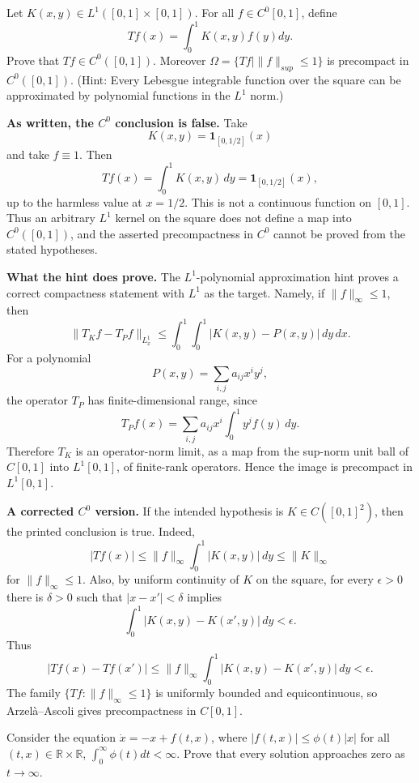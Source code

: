 \begin{exercise}
\label{analysis:2010:5}
Let $K(x, y) \in L^1([0, 1] \times [0, 1])$. For all $f \in C^0[0, 1]$, define
\[
Tf(x) = \int_0^1 K(x, y) f(y) dy.
\]
Prove that $Tf \in C^0([0, 1])$. Moreover $\Omega = \{ Tf \mid \|f\|_{sup} \leq 1 \}$ is precompact in $C^0([0, 1])$. (Hint: Every Lebesgue integrable function over the square can be approximated by polynomial functions in the $L^1$ norm.)
\end{exercise}

\begin{solution}
\textbf{As written, the $C^0$ conclusion is false.}
Take
\[
K(x,y)=\mathbf 1_{[0,1/2]}(x)
\]
and take \(f\equiv 1\). Then
\[
Tf(x)=\int_0^1K(x,y)\,dy=\mathbf 1_{[0,1/2]}(x),
\]
up to the harmless value at \(x=1/2\). This is not a continuous function on \([0,1]\). Thus an arbitrary \(L^1\) kernel on the square does not define a map into \(C^0([0,1])\), and the asserted precompactness in \(C^0\) cannot be proved from the stated hypotheses.

\textbf{What the hint does prove.}
The \(L^1\)-polynomial approximation hint proves a correct compactness statement with \(L^1\) as the target. Namely, if \(\|f\|_\infty\leq 1\), then
\[
\|T_Kf-T_Pf\|_{L^1_x}
\leq \int_0^1\int_0^1 |K(x,y)-P(x,y)|\,dy\,dx.
\]
For a polynomial
\[
P(x,y)=\sum_{i,j}a_{ij}x^iy^j,
\]
the operator \(T_P\) has finite-dimensional range, since
\[
T_Pf(x)=\sum_{i,j}a_{ij}x^i\int_0^1y^jf(y)\,dy.
\]
Therefore \(T_K\) is an operator-norm limit, as a map from the sup-norm unit ball of \(C[0,1]\) into \(L^1[0,1]\), of finite-rank operators. Hence the image is precompact in \(L^1[0,1]\).

\textbf{A corrected $C^0$ version.}
If the intended hypothesis is \(K\in C([0,1]^2)\), then the printed conclusion is true. Indeed,
\[
|Tf(x)|\leq \|f\|_\infty \int_0^1 |K(x,y)|\,dy
\leq \|K\|_\infty
\]
for \(\|f\|_\infty\leq 1\). Also, by uniform continuity of \(K\) on the square, for every \(\epsilon>0\) there is \(\delta>0\) such that \(|x-x'|<\delta\) implies
\[
\int_0^1 |K(x,y)-K(x',y)|\,dy<\epsilon.
\]
Thus
\[
|Tf(x)-Tf(x')|
\leq \|f\|_\infty\int_0^1|K(x,y)-K(x',y)|\,dy<\epsilon.
\]
The family \(\{Tf:\|f\|_\infty\leq1\}\) is uniformly bounded and equicontinuous, so Arzel\`a--Ascoli gives precompactness in \(C[0,1]\).
\end{solution}

\begin{exercise}
\label{analysis:2010:6}
Consider the equation $\dot{x} = -x + f(t, x)$, where $|f(t, x)| \leq \phi(t)|x|$ for all $(t, x) \in \mathbb{R} \times \mathbb{R}$, $\int_0^\infty \phi(t) dt < \infty$. Prove that every solution approaches zero as $t \to \infty$.
\end{exercise}


